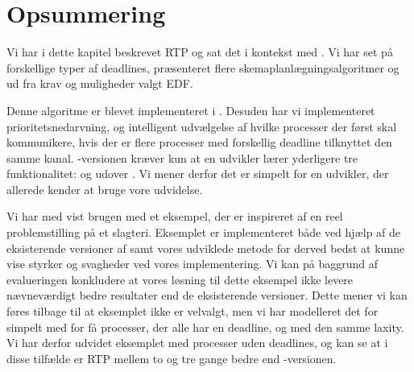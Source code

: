 \section{Opsummering}
Vi har i dette kapitel beskrevet RTP og sat det i kontekst med \pycsp. Vi har set på forskellige typer af deadlines, præsenteret flere skemaplanlægningsalgoritmer og ud fra krav og muligheder valgt EDF. 

Denne algoritme er blevet implementeret i \pycsp. Desuden har vi implementeret prioritetsnedarvning, og intelligent udvælgelse af hvilke processer der først skal kommunikere, hvis der er flere processer med forskellig deadline tilknyttet den samme kanal. -versionen kræver kun at en udvikler lærer yderligere tre funktionalitet:  og  udover \pycsp. Vi mener derfor det er simpelt for en udvikler, der allerede kender \pycsp at bruge vore udvidelse.

Vi har med vist brugen med et eksempel,  der er inspireret af en reel problemstilling på et slagteri. Eksemplet er implementeret både ved hjælp af de eksisterende versioner af \pycsp  samt vores udviklede metode for derved bedst at kunne vise styrker og svagheder ved vores implementering. Vi kan på baggrund af evalueringen konkludere at vores løsning til dette eksempel ikke levere nævneværdigt bedre resultater end de eksisterende versioner. Dette mener vi kan føres tilbage til at eksemplet ikke er velvalgt, men vi har modelleret det for simpelt med for få processer, der alle har en deadline, og med den samme laxity. Vi har derfor udvidet eksemplet med processer uden deadlines, og kan se at i disse tilfælde er RTP mellem to og tre gange bedre end -versionen. 






